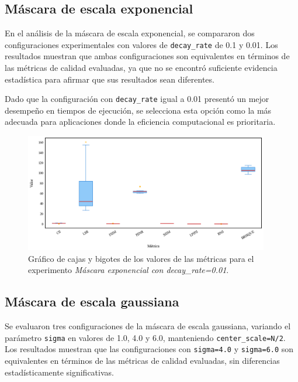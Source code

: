 \subsection{Máscara de escala exponencial}

En el análisis de la máscara de escala exponencial, se compararon dos configuraciones experimentales con valores de \texttt{decay\_rate} de 0.1 y 0.01. Los resultados muestran que ambas configuraciones son equivalentes en términos de las métricas de calidad evaluadas, ya que no se encontró suficiente evidencia estadística para afirmar que sus resultados sean diferentes.

Dado que la configuración con \texttt{decay\_rate} igual a 0.01 presentó un mejor desempeño en tiempos de ejecución, se selecciona esta opción como la más adecuada para aplicaciones donde la eficiencia computacional es prioritaria.

\begin{figure}[H]
    \centering
    \includegraphics[width=0.95\textwidth]{Graphics/boxplot-exponential-mask.png}
    \caption{Gráfico de cajas y bigotes de los valores de las métricas para el experimento \textit{Máscara exponencial con decay\_rate=0.01}.}
    \label{fig:boxplot-exponential}
\end{figure}

\subsection{Máscara de escala gaussiana}

Se evaluaron tres configuraciones de la máscara de escala gaussiana, variando el parámetro \texttt{sigma} en valores de 1.0, 4.0 y 6.0, manteniendo \texttt{center\_scale=N/2}. Los resultados muestran que las configuraciones con \texttt{sigma=4.0} y \texttt{sigma=6.0} son equivalentes en términos de las métricas de calidad evaluadas, sin diferencias estadísticamente significativas.

